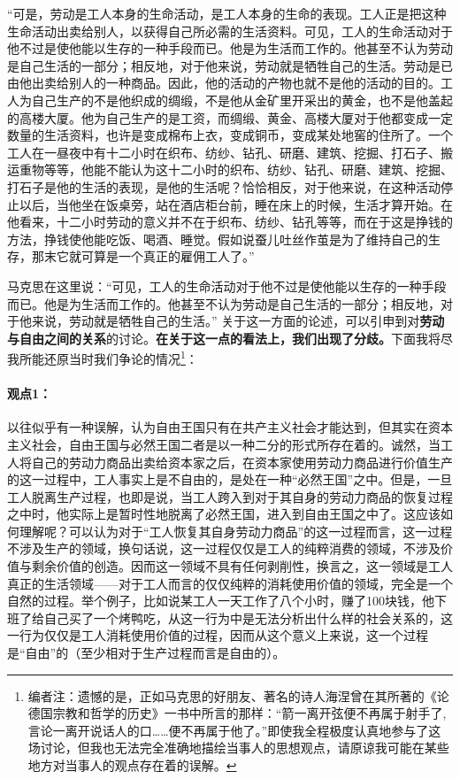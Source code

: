 \documentclass[a4paper,twoside,12pt,AutoFakeBold]{ctexart}
\begin{document}
\begin{adjustwidth}{2em}{2em}
    \qquad\fangsong
“可是，劳动是工人本身的生命活动，是工人本身的生命的表现。工人正是把这种生命活动出卖给别人，以获得自己所必需的生活资料。可见，工人的生命活动对于他不过是使他能以生存的一种手段而已。他是为生活而工作的。他甚至不认为劳动是自己生活的一部分；相反地，对于他来说，劳动就是牺牲自己的生活。劳动是已由他出卖给别人的一种商品。因此，他的活动的产物也就不是他的活动的目的。工人为自己生产的不是他织成的绸缎，不是他从金矿里开采出的黄金，也不是他盖起的高楼大厦。他为自己生产的是工资，而绸缎、黄金、高楼大厦对于他都变成一定数量的生活资料，也许是变成棉布上衣，变成铜币，变成某处地窖的住所了。一个工人在一昼夜中有十二小时在织布、纺纱、钻孔、研磨、建筑、挖掘、打石子、搬运重物等等，他能不能认为这十二小时的织布、纺纱、钻孔、研磨、建筑、挖掘、打石子是他的生活的表现，是他的生活呢？恰恰相反，对于他来说，在这种活动停止以后，当他坐在饭桌旁，站在酒店柜台前，睡在床上的时候，生活才算开始。在他看来，十二小时劳动的意义并不在于织布、纺纱、钻孔等等，而在于这是挣钱的方法，挣钱使他能吃饭、喝酒、睡觉。假如说蚕儿吐丝作茧是为了维持自己的生存，那末它就可算是一个真正的雇佣工人了。”
\end{adjustwidth}

马克思在这里说：“可见，工人的生命活动对于他不过是使他能以生存的一种手段而已。他是为生活而工作的。他甚至不认为劳动是自己生活的一部分；相反地，对于他来说，劳动就是牺牲自己的生活。”
关于这一方面的论述，可以引申到对\textbf{劳动与自由之间的关系}的讨论。\textbf{在关于这一点的看法上，我们出现了分歧。}下面我将尽我所能还原当时我们争论的情况\footnote{编者注：遗憾的是，正如马克思的好朋友、著名的诗人海涅曾在其所著的《论德国宗教和哲学的历史》一书中所言的那样：“箭一离开弦便不再属于射手了,言论一离开说话人的口……便不再属于他了。”即使我全程极度认真地参与了这场讨论，但我也无法完全准确地描绘当事人的思想观点，请原谅我可能在某些地方对当事人的观点存在着的误解。}：

\paragraph{观点1：}\begin{fangsong}
以往似乎有一种误解，认为自由王国只有在共产主义社会才能达到，但其实在资本主义社会，自由王国与必然王国二者是以一种二分的形式所存在着的。诚然，当工人将自己的劳动力商品出卖给资本家之后，在资本家使用劳动力商品进行价值生产的这一过程中，工人事实上是不自由的，是处在一种“必然王国”之中。但是，一旦工人脱离生产过程，也即是说，当工人跨入到对于其自身的劳动力商品的恢复过程之中时，他实际上是暂时性地脱离了必然王国，进入到自由王国之中了。这应该如何理解呢？可以认为对于“工人恢复其自身劳动力商品”的这一过程而言，这一过程不涉及生产的领域，换句话说，这一过程仅仅是工人的纯粹消费的领域，不涉及价值与剩余价值的创造。因而这一领域不具有任何剥削性，换言之，这一领域是工人真正的生活领域——对于工人而言的仅仅纯粹的消耗使用价值的领域，完全是一个自然的过程。举个例子，比如说某工人一天工作了八个小时，赚了100块钱，他下班了给自己买了一个烤鸭吃，从这一行为中是无法分析出什么样的社会关系的，这一行为仅仅是工人消耗使用价值的过程，因而从这个意义上来说，这一个过程是“自由”的（至少相对于生产过程而言是自由的）。
\end{fangsong}
\end{document}

